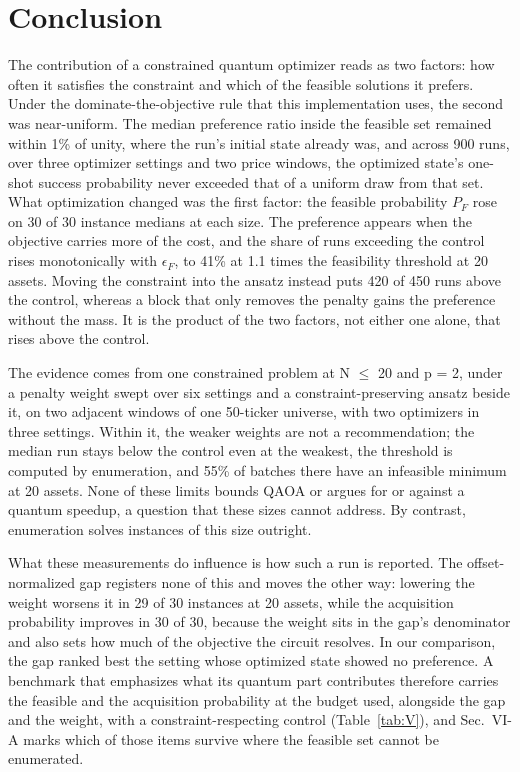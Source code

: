 \documentclass[journal]{IEEEtran}
\begin{document}
\section{Conclusion}


The contribution of a constrained quantum optimizer reads as two factors: how often it satisfies the constraint and which of the feasible solutions it prefers. Under the dominate-the-objective rule that this implementation uses, the second was near-uniform. The median preference ratio inside the feasible set remained within 1\% of unity, where the run's initial state already was, and across 900 runs, over three optimizer settings and two price windows, the optimized state's one-shot success probability never exceeded that of a uniform draw from that set. What optimization changed was the first factor: the feasible probability $P_{F}$ rose on 30 of 30 instance medians at each size. The preference appears when the objective carries more of the cost, and the share of runs exceeding the control rises monotonically with $\epsilon_{F}$, to 41\% at 1.1 times the feasibility threshold at 20 assets. Moving the constraint into the ansatz instead puts 420 of 450 runs above the control, whereas a block that only removes the penalty gains the preference without the mass. It is the product of the two factors, not either one alone, that rises above the control.


The evidence comes from one constrained problem at N $\leq$ 20 and p = 2, under a penalty weight swept over six settings and a constraint-preserving ansatz beside it, on two adjacent windows of one 50-ticker universe, with two optimizers in three settings. Within it, the weaker weights are not a recommendation; the median run stays below the control even at the weakest, the threshold is computed by enumeration, and 55\% of batches there have an infeasible minimum at 20 assets. None of these limits bounds QAOA or argues for or against a quantum speedup, a question that these sizes cannot address. By contrast, enumeration solves instances of this size outright.


What these measurements do influence is how such a run is reported. The offset-normalized gap registers none of this and moves the other way: lowering the weight worsens it in 29 of 30 instances at 20 assets, while the acquisition probability improves in 30 of 30, because the weight sits in the gap's denominator and also sets how much of the objective the circuit resolves. In our comparison, the gap ranked best the setting whose optimized state showed no preference. A benchmark that emphasizes what its quantum part contributes therefore carries the feasible and the acquisition probability at the budget used, alongside the gap and the weight, with a constraint-respecting control (Table~\ref{tab:V}), and Sec.~VI-A marks which of those items survive where the feasible set cannot be enumerated.
\end{document}
